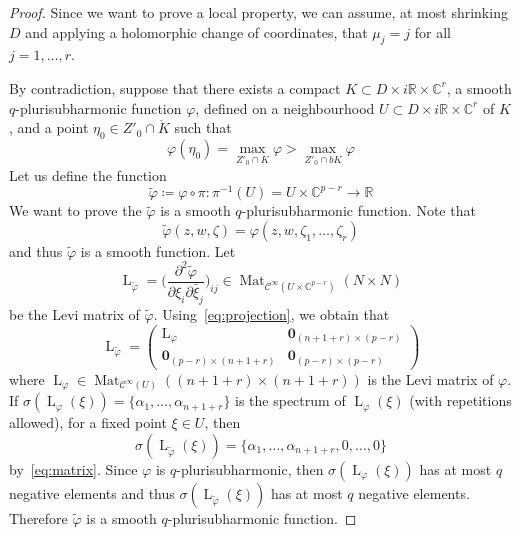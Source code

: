 \documentclass[10pt,a4paper]{amsart}
\newcommand{\C}{\numberset{C}}
\DeclareMathOperator{\Mat}{Mat}
\newcommand{\R}{\numberset{R}}
\newcommand{\numberset}{\mathbb}
\renewcommand{\phi}{\varphi}
\renewcommand{\vec}{\boldsymbol}
\begin{document}
\begin{proof}
    Since we want to prove a local property, we can assume, at most shrinking $D$ and applying a holomorphic change of coordinates, that $\mu_j=j$ for all $j=1,\dots,r$.

    By contradiction, suppose that there exists a compact $K\subset D\times i\R\times\C^r$, a smooth $q$-plurisub\-harmonic function $\phi$, defined on a neighbourhood $U\subset D\times i\R\times\C^r$ of $K$, and a point $\eta_0\in Z'_0\cap\mathring{K}$ such that
    \begin{equation}
    \label{eq:contradiction}
        \phi(\eta_0)=\max_{Z'_0\cap K}\phi>\max_{Z'_0\cap bK}\phi
    \end{equation}
    Let us define the function
    \[
        \tilde\phi\coloneqq\phi\circ\pi:\pi^{-1}(U)=U\times\C^{p-r}\to\R
    \]
    We want to prove the $\tilde\phi$ is a smooth $q$-plurisubharmonic function. Note that
    \begin{equation}
    \label{eq:projection}
        \tilde\phi(z,w,\zeta)=\phi(z,w,\zeta_1,\dots,\zeta_r)
    \end{equation}
    and thus $\tilde\phi$ is a smooth function. Let
    \[
        \operatorname{L}_{\tilde\phi}=\biggl(\frac{\partial^2\tilde\phi}{\partial\xi_i \partial\bar{\xi}_j}\biggr)_{ij}\in\Mat_{\mathscr{C}^\infty(U\times\C^{p-r})}(N\times N)
    \]
    be the Levi matrix of $\tilde\phi$. Using~\eqref{eq:projection}, we obtain that
    \begin{equation}
    \label{eq:matrix}
        \operatorname{L}_{\tilde\phi}=
        \begin{pmatrix}
            \operatorname{L}_\phi & \vec{0}_{(n+1+r)\times(p-r)} \\
            \vec{0}_{(p-r)\times(n+1+r)} & \vec{0}_{(p-r)\times(p-r)}
        \end{pmatrix}
    \end{equation}
    where $\operatorname{L}_\phi\in\Mat_{\mathscr{C}^\infty(U)}((n+1+r)\times(n+1+r))$ is the Levi matrix of $\phi$. If $\sigma(\operatorname{L}_\phi(\xi))=\{\alpha_1,\dots,\alpha_{n+1+r}\}$ is the spectrum of $\operatorname{L}_\phi(\xi)$ (with repetitions allowed), for a fixed point $\xi\in U$, then
    \[
        \sigma(\operatorname{L}_{\tilde\phi}(\xi))=\{\alpha_1,\dots,\alpha_{n+1+r},0,\dots,0\}
    \]
    by~\eqref{eq:matrix}. Since $\phi$ is $q$-plurisubharmonic, then $\sigma(\operatorname{L}_\phi(\xi))$ has at most $q$ negative elements and thus $\sigma(\operatorname{L}_{\tilde\phi}(\xi))$ has at most $q$ negative elements. Therefore $\tilde\phi$ is a smooth $q$-plurisubharmonic function.


\end{proof}
\end{document}
